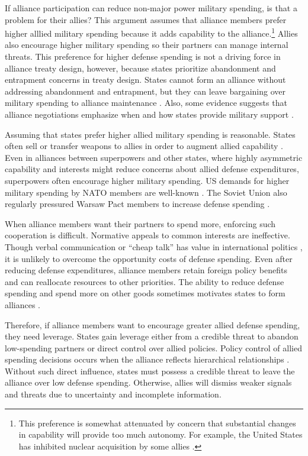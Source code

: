 \documentclass[12pt]{article}
\begin{document}
If alliance participation can reduce non-major power military spending, is that a problem for their allies? 
This argument assumes that alliance members prefer higher alllied military spending because it adds capability to the alliance.\footnote{This preference is somewhat attenuated by concern that substantial changes in capability will provide too much autonomy. For example, the United States has inhibited nuclear acquisition by some allies \citep{Gavin2015, Lanoszka2015}.}
Allies also encourage higher military spending so their partners can manage internal threats.
This preference for higher defense spending is not a driving force in alliance treaty design, however, because states prioritize abandonment and entrapment concerns in treaty design. 
States cannot form an alliance without addressing abandonment and entrapment, but they can leave bargaining over military spending to alliance maintenance \citep{Snyder1997}.
Also, some evidence suggests that alliance negotiations emphasize when and how states provide military support \citep{Poast2019a}. 


Assuming that states prefer higher allied military spending is reasonable. 
States often sell or transfer weapons to allies in order to augment allied capability \citep{Yarhi-Miloetal2016, Pampetal2018}. 
Even in alliances between superpowers and other states, where highly asymmetric capability and interests might reduce concerns about allied defense expenditures, superpowers often encourage higher military spending. 
US demands for higher military spending by NATO members are well-known \citep{SchuesslerShifrinson2019}.
The Soviet Union also regularly pressured Warsaw Pact members to increase defense spending \citep{Simon1985}. 


When alliance members want their partners to spend more, enforcing such cooperation is difficult. 
Normative appeals to common interests are ineffective. 
Though verbal communication or ``cheap talk'' has value in international politics \citep{Trager2010}, it is unlikely to overcome the opportunity costs of defense spending. 
Even after reducing defense expenditures, alliance members retain foreign policy benefits and can reallocate resources to other priorities. 
The ability to reduce defense spending and spend more on other goods sometimes motivates states to form alliances \citep{Kimball2010, AllenDigiuseppe2013}. 


Therefore, if alliance members want to encourage greater allied defense spending, they need leverage. 
States gain leverage either from a credible threat to abandon low-spending partners or direct control over allied policies. 
Policy control of allied spending decisions occurs when the alliance reflects hierarchical relationships \citep{Lake1996}. 
Without such direct influence, states must possess a credible threat to leave the alliance over low defense spending. 
Otherwise, allies will dismiss weaker signals and threats due to uncertainty and incomplete information. 
\end{document}
